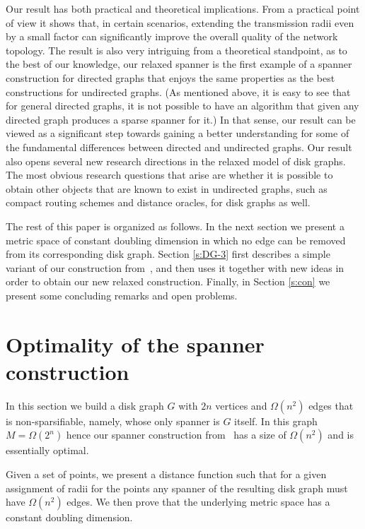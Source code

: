 \documentclass[proceedings]{stacs}
\theoremstyle{plain}\newtheorem{satz}[thm]{Satz}
\theoremstyle{definition}\newtheorem{crucial}[thm]{Crucial Definition}
\begin{document}
Our result has both practical and theoretical implications. From a
practical point of view it shows that, in certain scenarios,
extending the transmission radii even by a small factor can
significantly improve the overall quality of the network topology.
The result is also very intriguing from a theoretical standpoint,
as to the best of our knowledge, our relaxed spanner is the first
example of a spanner construction for directed graphs that enjoys
the same properties as the best constructions for undirected
graphs. (As mentioned above, it is easy to see that for general
directed graphs, it is not possible to have an algorithm that
given any directed graph produces a sparse spanner for it.) In
that sense, our result can be viewed as a significant step towards
gaining a better understanding for some of the fundamental
differences between directed and undirected graphs. Our result
also opens several new research directions in the relaxed model of
disk graphs. The most obvious research questions that arise are
whether it is possible to obtain other objects that are known to
exist in undirected graphs, such as compact routing schemes and
distance oracles, for disk graphs as well.

The rest of this paper is organized as follows. In the next
section
we present a metric space of constant doubling dimension in which
no edge can be removed from its corresponding disk graph. Section
\ref{s:DG-3} first describes a simple variant of our construction
from~\cite{PeRo08}, and then uses it together with new ideas in
order to obtain our new relaxed construction. Finally, in Section
\ref{s:con} we present some concluding remarks and open problems.

\section{Optimality of the spanner construction}
\label{s:Bad-Example}


In this section we build a disk graph $G$ with $2n$ vertices and
$\Omega(n^2)$ edges that is non-sparsifiable, namely, whose only
spanner is $G$ itself. In this graph $M=\Omega(2^n)$ hence our
spanner construction from~\cite{PeRo08} has a size of
$\Omega(n^2)$ and is essentially optimal.

Given a set of points, we present a distance function such that
for a given assignment of radii for the points any spanner of the
resulting disk graph must have $\Omega(n^2)$ edges. We then prove
that the underlying metric space has a constant doubling
dimension.
\end{document}

